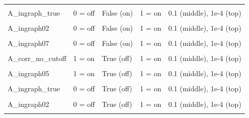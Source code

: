 \documentclass[
]{article}
\begin{document}
\begin{longtable}[t]{>{\raggedright\arraybackslash}p{8em}llll}
\cellcolor{gray!10}{A\_ingraph07} & \cellcolor{gray!10}{1 = on} & \cellcolor{gray!10}{False (on)} & \cellcolor{gray!10}{1 = on} & \cellcolor{gray!10}{0.1 (middle), 1e-4 (top)}\\
\addlinespace
A\_ingraph\_true & 0 = off & False (on) & 1 = on & 0.1 (middle), 1e-4 (top)\\
\cellcolor{gray!10}{A\_corr\_no\_cutoff} & \cellcolor{gray!10}{0 = off} & \cellcolor{gray!10}{False (on)} & \cellcolor{gray!10}{1 = on} & \cellcolor{gray!10}{0.1 (middle), 1e-4 (top)}\\
A\_ingraph02 & 0 = off & False (on) & 1 = on & 0.1 (middle), 1e-4 (top)\\
\cellcolor{gray!10}{A\_ingraph05} & \cellcolor{gray!10}{0 = off} & \cellcolor{gray!10}{False (on)} & \cellcolor{gray!10}{1 = on} & \cellcolor{gray!10}{0.1 (middle), 1e-4 (top)}\\
A\_ingraph07 & 0 = off & False (on) & 1 = on & 0.1 (middle), 1e-4 (top)\\
\addlinespace
\cellcolor{gray!10}{A\_ingraph\_true} & \cellcolor{gray!10}{1 = on} & \cellcolor{gray!10}{True (off)} & \cellcolor{gray!10}{1 = on} & \cellcolor{gray!10}{0.1 (middle), 1e-4 (top)}\\
A\_corr\_no\_cutoff & 1 = on & True (off) & 1 = on & 0.1 (middle), 1e-4 (top)\\
\cellcolor{gray!10}{A\_ingraph02} & \cellcolor{gray!10}{1 = on} & \cellcolor{gray!10}{True (off)} & \cellcolor{gray!10}{1 = on} & \cellcolor{gray!10}{0.1 (middle), 1e-4 (top)}\\
A\_ingraph05 & 1 = on & True (off) & 1 = on & 0.1 (middle), 1e-4 (top)\\
\cellcolor{gray!10}{A\_ingraph07} & \cellcolor{gray!10}{1 = on} & \cellcolor{gray!10}{True (off)} & \cellcolor{gray!10}{1 = on} & \cellcolor{gray!10}{0.1 (middle), 1e-4 (top)}\\
\addlinespace
A\_ingraph\_true & 0 = off & True (off) & 1 = on & 0.1 (middle), 1e-4 (top)\\
\cellcolor{gray!10}{A\_corr\_no\_cutoff} & \cellcolor{gray!10}{0 = off} & \cellcolor{gray!10}{True (off)} & \cellcolor{gray!10}{1 = on} & \cellcolor{gray!10}{0.1 (middle), 1e-4 (top)}\\
A\_ingraph02 & 0 = off & True (off) & 1 = on & 0.1 (middle), 1e-4 (top)\\
\cellcolor{gray!10}{A\_ingraph05} & \cellcolor{gray!10}{0 = off} & \cellcolor{gray!10}{True (off)} & \cellcolor{gray!10}{1 = on} & \cellcolor{gray!10}{0.1 (middle), 1e-4 (top)}\\

\end{longtable}
\end{document}
